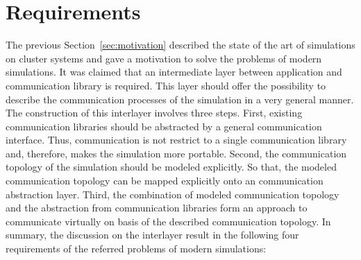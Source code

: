 



\section{Requirements}
\label{sec:requirements}

The previous Section~\ref{sec:motivation} described the state of the
art of simulations on cluster systems and gave a motivation to solve
the problems of modern simulations.
It was
claimed that an intermediate layer between application and communication
library is required.  This layer should offer the possibility to
describe the communication processes of the simulation in a very
general manner.  The construction of this interlayer involves three
steps.  First, existing communication libraries should be
abstracted by a general communication interface. Thus, communication
is not restrict to a single communication library and, therefore,
makes the simulation more portable.  Second, the communication
topology of the simulation should be modeled explicitly.  So that, the
modeled communication topology can be mapped explicitly onto an
communication abstraction layer.  Third, the combination of modeled
communication topology and the abstraction from communication
libraries form an approach to communicate virtually on basis of the
described communication topology.  In summary, the discussion on the
interlayer result in the following four requirements of the referred
problems of modern simulations:

